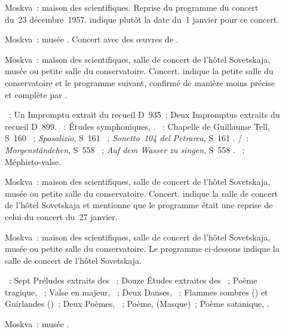 \begin{description}
 \item[]
 Moskva~: maison des scientifiques.
 Reprise du programme du concert du~23 décembre~1957.
 \citet[p.~180]{Nekrasova08} indique plutôt la date du~1\ier{} janvier pour
 ce concert.
 \item[]
 Moskva~: musée \Scriabine{}.
 Concert avec des œuvres de \Scriabine{}.
 \item[]
 Moskva~: maison des scientifiques, salle de concert de l'hôtel Sovetskaja,
 musée \Scriabine{} ou petite salle du conservatoire.
 Concert.
 \citet[p.~180-181]{Nekrasova08} indique la petite salle du conservatoire et
 le programme suivant, confirmé de manière moins précise et complète par
 \citet[p.~385]{Shiryaeva}.

 \textsc{\Schubert{}}~: Un Impromptu extrait du recueil D~935~; Deux
 Impromptus extraits du recueil D~899.
 \textsc{\Schumann{}}~: Études symphoniques, .
 \textsc{\Liszt{}}~: Chapelle de Guillaume Tell, S~160 ~;
 \emph{Sposalizio}, S~161 ~; \emph{Sonetto~104 del Petrarca},
 S~161 .
 \textsc{\Schubert{}/\Liszt{}}~: \emph{Morgenständchen}, S~558 ~;
 \emph{Auf dem Wasser zu singen}, S~558 .
 \textsc{\Liszt{}}~: Méphisto-valse.
 \item[]
 Moskva~: maison des scientifiques, salle de concert de l'hôtel Sovetskaja,
 musée \Scriabine{} ou petite salle du conservatoire.
 Concert.
 \citet[p.~181]{Nekrasova08} indique la salle de concert de l'hôtel
 Sovetskaja et mentionne que le programme était une reprise de celui du
 concert du~27 janvier.
 \item[]
 Moskva~: maison des scientifiques, salle de concert de l'hôtel Sovetskaja,
 musée \Scriabine{} ou petite salle du conservatoire.
 Le programme ci-dessous indique la salle de concert de l'hôtel Sovetskaja.

 \textsc{\Scriabine{}}~: Sept Préludes extraits des ~; Douze Études extraites des ~; Poème tragique,
 ~; Valse en \kA \Flat majeur, ~; Deux Danses, ~:
 Flammes sombres () et Guirlandes ()~; Deux Poèmes,
 ~; Poème,   (Masque)~; Poème satanique,
 .
 \item[]
 Moskva~: musée \Scriabine{}.


\end{description}
